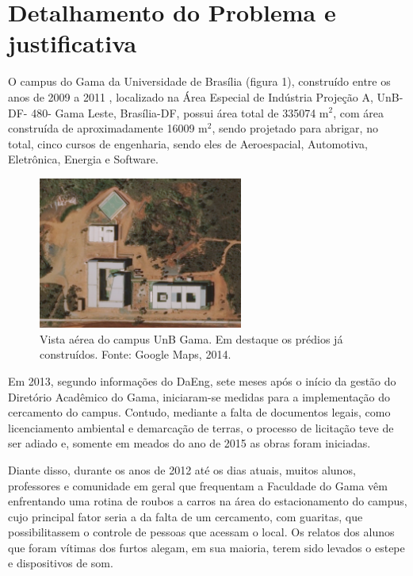 \section{Detalhamento do Problema e justificativa} %
\label{sec:detalhamentoProblema}

O campus do Gama da Universidade de Brasília (figura 1), construído entre os anos de 2009 a 2011 , localizado na Área Especial de Indústria Projeção A, UnB- DF- 480- Gama Leste, Brasília-DF, possui área total de 335074 m$^2$, com área construída de aproximadamente 16009 m$^2$, sendo projetado para abrigar, no total, cinco cursos de engenharia, sendo eles de Aeroespacial, Automotiva, Eletrônica, Energia e Software.

\begin{figure}[H]
	\centering
	\includegraphics[width=0.6\textwidth]{figuras/fga1}
	\caption{Vista aérea do campus UnB Gama. Em destaque os prédios já construídos. Fonte: Google Maps, 2014.}
	\label{img:fga1}
\end{figure}


Em 2013, segundo informações do DaEng, sete meses após o início da gestão do Diretório Acadêmico do Gama, iniciaram-se medidas para a implementação do cercamento do campus. Contudo, mediante a falta de documentos legais, como licenciamento ambiental e demarcação de terras, o processo de licitação teve de ser adiado e, somente em meados do ano de 2015 as obras foram iniciadas.

Diante disso, durante os anos de 2012 até os dias atuais, muitos alunos, professores e comunidade em geral que frequentam a Faculdade do Gama vêm enfrentando uma rotina de roubos a carros na área do estacionamento do campus, cujo principal fator seria a da falta de um cercamento, com guaritas, que possibilitassem o controle de pessoas que acessam o local. Os relatos dos alunos que foram vítimas dos furtos alegam, em sua maioria, terem sido levados o estepe e dispositivos de som.

